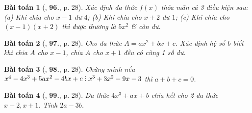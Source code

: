 \documentclass{article}
\numberwithin{equation}{section}
\newtheorem{baitoan}{Bài toán}
\DeclareRobustCommand{\divby}{%
	\mathrel{\vbox{\baselineskip.65ex\lineskiplimit0pt\hbox{.}\hbox{.}\hbox{.}}}%
}
\begin{document}
\begin{baitoan}[\cite{Tuyen_Toan_8}, \textbf{96.}, p. 28]
	Xác định đa thức $f(x)$ thỏa mãn cả 3 điều kiện sau: (a) Khi chia cho $x - 1$ dư $4$; (b) Khi chia cho $x + 2$ dư $1$; (c) Khi chia cho $(x - 1)(x + 2)$ thì được thương là $5x^2$ \& còn dư.
\end{baitoan}

\begin{baitoan}[\cite{Tuyen_Toan_8}, \textbf{97.}, p. 28]
	Cho đa thức $A = ax^2 + bx + c$. Xác định hệ số $b$ biết khi chia $A$ cho $x - 1$, chia $A$ cho $x + 1$ đều có cùng 1 số dư.
\end{baitoan}

\begin{baitoan}[\cite{Tuyen_Toan_8}, \textbf{98.}, p. 28]
	Chứng minh nếu $x^4 - 4x^3 + 5ax^2 - 4bx + c\divby x^3 + 3x^2 - 9x - 3$ thì $a + b + c = 0$.
\end{baitoan}

\begin{baitoan}[\cite{Tuyen_Toan_8}, \textbf{99.}, p. 28]
	Đa thức $4x^3 + ax + b$ chia hết cho 2 đa thức $x - 2,x + 1$. Tính $2a - 3b$.
\end{baitoan}


\printbibliography[heading=bibintoc]
	
\end{document}
